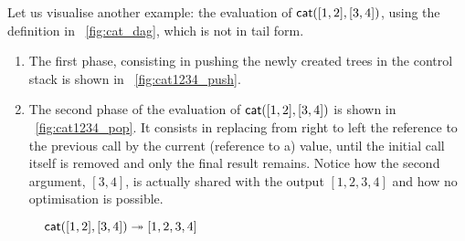 Let us visualise another example: the evaluation of
\(\textsf{cat}([1,2],[3,4])\), using the definition in
\fig~\vref{fig:cat_dag}, which is not in tail form.
\begin{enumerate}

  \item The first phase, consisting in pushing the newly created trees
    in the control stack is shown in \fig~\vref{fig:cat1234_push}.

  \item The second phase of the evaluation of
    \(\textsf{cat}([1,2],[3,4])\) is shown in
    \fig~\vref{fig:cat1234_pop}. It consists in replacing from right
    to left the reference to the previous call by the current
    (reference to a) value, until the initial call itself is removed
    and only the final result remains. Notice how the second argument,
    \([3,4]\), is actually shared with the output \([1,2,3,4]\) and
    how no optimisation is possible.
\end{enumerate}
\begin{figure}[!t]
\centering
{}
\vskip32pt
{}
\caption{\(\textsf{cat}([1,2],[3,4]) \twoheadrightarrow [1,2,3,4]\)} %
\end{figure}

\vspace*{-5mm}

\label{sec:into_tail_form}

